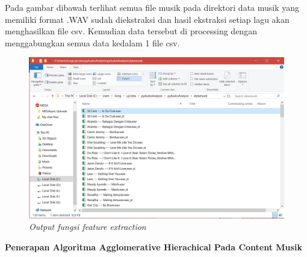    Pada gambar dibawah terlihat semua file musik pada direktori data musik yang memiliki format .WAV  sudah diekstraksi dan hasil ekstraksi setiap lagu akan menghasilkan  file csv. Kemudian data tersebut di processing dengan menggabungkan semua data kedalam 1 file csv. 
     \begin{figure} [htbp]
    \centering
    \includegraphics[scale=0.35] {figures/image033.png}
    \caption{\textit{Output fungsi feature extraction}}
    \end{figure}
\par\textbf{Penerapan Algoritma Agglomerative Hierachical Pada Content Musik} 

